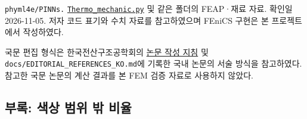 \documentclass[10pt,a4paper]{article}
\renewcommand{\arraystretch}{1.25}
\begin{document}
{\small\color{muted} \nolinkurl{phyml4e/PINNs.} \href{https://github.com/phyml4e/PINNs/blob/5b426dc8eb2255b1bb3b8630619228b36cdb464e/Thermomechanic/Thermo_mechanic.py}{\nolinkurl{Thermo_mechanic.py}} 및 같은 폴더의 FEAP·재료 자료. 확인일 2026-11-05. 저자 코드 표기와 수치 자료를 참고하였으며 FEniCS 구현은 본 프로젝트에서 작성하였다.\par}

{\small\color{muted} 국문 편집 형식은 한국전산구조공학회의 \href{https://www.jcoseik.or.kr/journal-information/instructions-for-authors/}{논문 작성 지침} 및 \nolinkurl{docs/EDITORIAL_REFERENCES_KO.md}에 기록한 국내 논문의 서술 방식을 참고하였다. 참고한 국문 논문의 계산 결과를 본 FEM 검증 자료로 사용하지 않았다.\par}

\subsection{부록: 색상 범위 밖 비율}

\begingroup\fontsize{8}{10.5}\selectfont\renewcommand{\arraystretch}{1.1}
\end{document}
